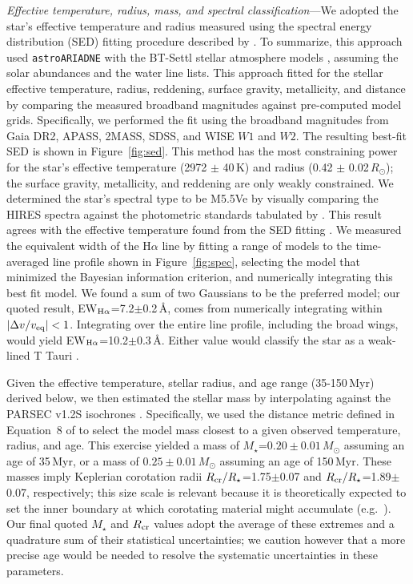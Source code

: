 \documentclass[11pt,twocolumn,tighten,linenumbers]{aastex7}
\begin{document}
{\it Effective temperature, radius, mass, and spectral
classification}---We adopted the star's effective temperature and
radius measured using the spectral energy distribution (SED) fitting
procedure described by \citep{Bouma2024}.  To summarize, this approach
used \texttt{astroARIADNE} \citep{Vines2022} with the BT-Settl stellar
atmosphere models \citep{Allard2012}, assuming the \citep{Asplund2009}
solar abundances and the \citep{Barber2006} water line lists.  This
approach fitted for the stellar effective temperature, radius,
reddening, surface gravity, metallicity, and distance by comparing the
measured broadband magnitudes against pre-computed model grids.
Specifically, we performed the fit using the broadband magnitudes from
Gaia DR2, APASS, 2MASS, SDSS, and WISE $W1$ and $W2$.  The resulting
best-fit SED is shown in Figure~\ref{fig:sed}.
This method has the most constraining power for the star's effective
temperature (2972 $\pm$ 40\,K) and radius (0.42 $\pm$
0.02\,$R_\odot$); the surface gravity, metallicity, and reddening are
only weakly constrained.  We determined the star's spectral type to be
M5.5Ve by visually comparing the HIRES spectra against the photometric
standards tabulated by \citep{Bochanski2007}.   This result agrees with
the effective temperature found from the SED fitting
\citep{Pecaut2013}.  We measured the equivalent width of the H$\alpha$
line by fitting a range of models to the time-averaged line profile
shown in Figure~\ref{fig:spec}, selecting the model that minimized the
Bayesian information criterion, and numerically integrating this best
fit model.  We found a sum of two Gaussians to be the preferred model;
our quoted result, EW$_{{\rm H}\alpha}$=7.2$\pm$0.2\,\AA, comes from
numerically integrating within $|\Delta v/v_{\rm eq}|<1$.  Integrating
over the entire line profile, including the broad wings, would yield
EW$_{{\rm H}\alpha}$=10.2$\pm$0.3\,\AA. Either value would classify
the star as a weak-lined T Tauri \citep{Briceno2019}.

Given the effective temperature, stellar radius, and age range
(35-150\,Myr) derived below, we then estimated the stellar mass by
interpolating against the PARSEC v1.2S isochrones \citep{Chen2014}.
Specifically, we used the distance metric defined in Equation~8 of
\citet{Bouma2024} to select the model mass closest to a given observed
temperature, radius, and age.  This exercise yielded a mass of
$M_\star$=$0.20\pm0.01$\,$M_\odot$ assuming an age of 35\,Myr, or a
mass of $0.25\pm0.01$\,$M_\odot$ assuming an age of 150\,Myr.  These
masses imply Keplerian corotation radii $R_{\rm
cr}/R_\star$=1.75$\pm$0.07 and $R_{\rm cr}/R_\star$=1.89$\pm$0.07,
respectively; this size scale is relevant because it is theoretically
expected to set the inner boundary at which corotating material might
accumulate (e.g.~\citep{Townsend2005,Daley-Yates2024}).  Our final
quoted $M_\star$ and $R_{\rm cr}$ values adopt the average of these
extremes and a quadrature sum of their statistical uncertainties; we
caution however that a more precise age would be needed to resolve the
systematic uncertainties in these parameters.
\end{document}
